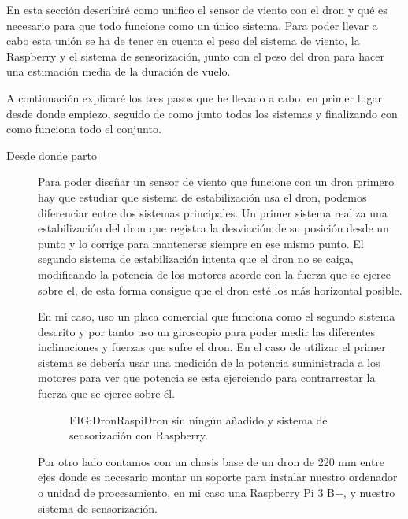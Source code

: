 
En esta sección describiré como unifico el sensor de viento con el dron y qué es necesario para que todo funcione como un único sistema.
Para poder llevar a cabo esta unión se ha de tener en cuenta el peso del sistema de viento, la Raspberry y el sistema de sensorización, junto con el peso del dron para hacer una estimación media de la duración de vuelo.

A continuación explicaré los tres pasos que he llevado a cabo: en primer lugar desde donde empiezo, seguido de como junto todos los sistemas y finalizando con como funciona todo el conjunto.

\begin{description}
\item[Desde donde parto]
Para poder diseñar un sensor de viento que funcione con un dron primero hay que estudiar que sistema de estabilización usa el dron, podemos diferenciar entre dos sistemas principales. Un primer sistema realiza una estabilización del dron que registra la desviación de su posición desde un punto y lo corrige para mantenerse siempre en ese mismo punto. El segundo sistema de estabilización intenta que el dron no se caiga, modificando la potencia de los motores acorde con la fuerza que se ejerce sobre el, de esta forma consigue que el dron esté los más horizontal posible.

En mi caso, uso un placa comercial que funciona como el segundo sistema descrito y por tanto uso un giroscopio para poder medir las diferentes inclinaciones y fuerzas que sufre el dron. En el caso de utilizar el primer sistema se debería usar una medición de la potencia suministrada a los motores para ver que potencia se esta ejerciendo para contrarrestar la fuerza que se ejerce sobre él.

\begin{figure}[Dron y sensorización]{FIG:DronRaspi}{Dron sin ningún añadido y sistema de sensorización con Raspberry.}
	
   \quad
  
\end{figure} 

Por otro lado contamos con un chasis base de un dron de 220 mm entre ejes donde es necesario montar un soporte para instalar nuestro ordenador o unidad de procesamiento, en mi caso una Raspberry Pi 3 B+, y nuestro sistema de sensorización.


\end{description}
